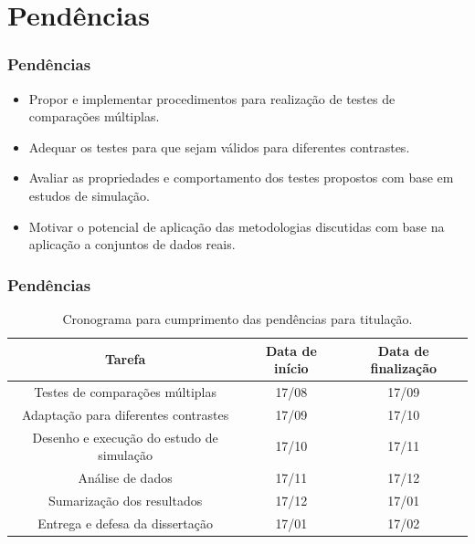 \documentclass[10pt,
  aspectratio=169,
  serif,
  mathserif,
  professionalfont,
  compress,
  handout,
  ]{beamer}\usepackage[]{graphicx}\usepackage[]{color}
\begin{document}

\section{Pendências}


\begin{frame}
  \frametitle{Pendências}
 
\begin{itemize}
\itemsep 2ex

  \item Propor e implementar procedimentos para realização de testes de comparações múltiplas.
  
  \item Adequar os testes para que sejam válidos para diferentes contrastes. 
  
  \item Avaliar as propriedades e comportamento dos testes propostos com base em estudos de simulação.
  
  \item Motivar o potencial de aplicação das metodologias discutidas com base na aplicação a conjuntos de dados reais.
  
\end{itemize}

\end{frame}


\begin{frame}
  \frametitle{Pendências}
 
\begin{table}[H]
\centering
\begin{tabular}{ccc}
\hline
\textbf{Tarefa}                                   & \textbf{Data de início} & \textbf{Data de finalização} \\ \hline
Testes de comparações múltiplas & 17/08                   & 17/09                        \\
Adaptação para diferentes contrastes  & 17/09                   & 17/10                        \\
Desenho e execução do estudo de simulação         & 17/10                   & 17/11                        \\
Análise de dados                                  & 17/11                   & 17/12                        \\
Sumarização dos resultados                        & 17/12                   & 17/01                        \\
Entrega e defesa da dissertação                   & 17/01                   & 17/02                        \\ \hline
\end{tabular}
\caption{Cronograma para cumprimento das pendências para titulação.}
\label{tab:crono}
\end{table}

\end{frame}
\end{document}
